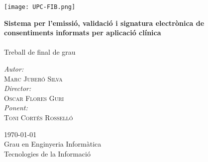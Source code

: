 \begin{titlepage}
\center

\texttt{[image: UPC-FIB.png]}
\vspace{2cm}


{\huge \bfseries Sistema per l'emissió, validació i signatura electrònica de consentiments informats per aplicació clínica}\\[0.4cm]
\HRule \\[0.2cm]


\Large Treball de final de grau

\vspace{5cm}

\emph{Autor:}\\ \large
 \textsc{Marc Juberó Silva}\\
\vspace{0.5cm}
\emph{Director:}\\ \large
 \textsc{Oscar Flores Guri}\\
\vspace{0.5cm}
\emph{Ponent:}\\ \large
 \textsc{Toni Cortés Rosselló}\\

\vspace{1cm}


{\large \today}\\[1cm] %

\vspace{1 cm}
Grau en Enginyeria Informàtica\\
Tecnologies de la Informació\\
\vspace{1 cm}

\vfill
\end{titlepage}